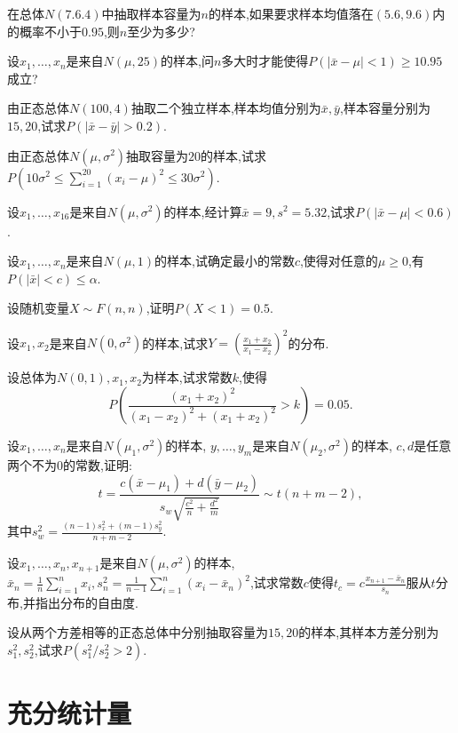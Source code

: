 \begin{xiti}
\item 在总体$N(7.6.4)$中抽取样本容量为$n$的样本,如果要求样本均值落在$(5.6,9.6)$内的概率不小于$0.95$,则$n$至少为多少?
\item 设$x_1,\dotsc,x_n$是来自$N(\mu,25)$的样本,问$n$多大时才能使得$P(|\bar x-\mu|<1)\ge10.95$成立?
\item 由正态总体$N(100,4)$抽取二个独立样本,样本均值分别为$\bar x,\bar y$,样本容量分别为$15,20$,试求$P(|\bar x-\bar y|>0.2)$.
\item 由正态总体$N(\mu,\sigma^2)$抽取容量为$20$的样本,试求$P(10\sigma^2\leq\sum_{i=1}^{20}(x_i-\mu)^2\leq30\sigma^2)$.
\item 设$x_1,\dotsc,x_{16}$是来自$N(\mu,\sigma^2)$的样本,经计算$\bar x=9,s^2=5.32$,试求$P(|\bar x-\mu|<0.6)$.
\item 设$x_1,\dotsc,x_n$是来自$N(\mu,1)$的样本,试确定最小的常数$c$,使得对任意的$\mu\geq0$,有$P(|\bar x|<c)\leq\alpha$.
\item 设随机变量$X\sim F(n,n)$,证明$P(X<1)=0.5$.
\item 设$x_1,x_2$是来自$N(0,\sigma^2)$的样本,试求$Y=\left(\frac{x_1+x_2}{x_1-x_2}\right)^2$的分布.
\item 设总体为$N(0,1),x_1,x_2$为样本,试求常数$k$,使得
\[
P\left( \frac{\left( x_1+x_2 \right) ^2}{\left( x_1-x_2 \right) ^2+\left( x_1+x_2 \right) ^2}>k \right) =0.05.
\]
\item 设$x_1,\dotsc,x_n$是来自$N(\mu_1,\sigma^2)$的样本, $y,\dotsc,y_m$是来自$N(\mu_2,\sigma^2)$的样本, $c,d$是任意两个不为0的常数,证明:
\[
t=\frac{c\left( \bar{x}-\mu _1 \right) +d\left( \bar{y}-\mu _2 \right)}{s_w\sqrt{\frac{c^2}{n}+\frac{d^2}{m}}}\sim t\left( n+m-2 \right),
\]
其中$s_{w}^{2}=\frac{\left( n-1 \right) s_{x}^{2}+\left( m-1 \right) s_{y}^{2}}{n+m-2}$.
\item 设$x_1,\dotsc,x_n,x_{n+1}$是来自$N(\mu,\sigma^2)$的样本, $\bar x_n=\frac1n\sum_{i=1}^nx_i,s_n^2=\frac1{n-1}\sum_{i=1}^n(x_i-\bar x_n)^2$,试求常数$c$使得$t_c=c\frac{x_{n+1}-\bar x_n}{s_n}$服从$t$分布,并指出分布的自由度.
\item 设从两个方差相等的正态总体中分别抽取容量为$15,20$的样本,其样本方差分别为$s_1^2,s_2^2$,试求$P(s_1^2/s_2^2>2)$.
\end{xiti}
\section{充分统计量\label{sec:5.5}}
